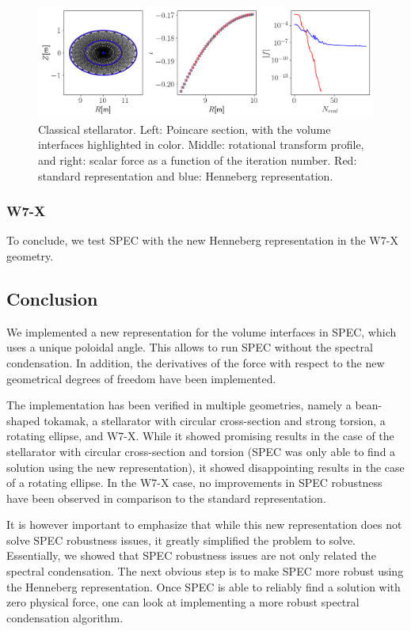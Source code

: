 \documentclass[my_thesis.tex]{subfiles}
\begin{document}
\begin{figure}
	\centering
	\includegraphics[width=\linewidth]{images/HennebergRepresentation/RotatingEllipse.png}
	\caption{Classical stellarator. Left: Poincare section, with the volume interfaces highlighted in color. Middle: rotational transform profile, and right: scalar force as a function of the iteration number. Red: standard representation and blue: Henneberg representation.}
	\label{fig classical stellarator henneberg representation}
\end{figure}


\subsubsection{W7-X}
To conclude, we test SPEC with the new Henneberg representation in the W7-X geometry.

\subsection{Conclusion}

We implemented a new representation for the volume interfaces in SPEC, which uses a unique poloidal angle. This allows to run SPEC without the spectral condensation. In addition, the derivatives of the force with respect to the new geometrical degrees of freedom have been implemented.

The implementation has been verified in multiple geometries, namely a bean-shaped tokamak, a stellarator with circular cross-section and strong torsion, a rotating ellipse, and W7-X. While it showed promising results in the case of the stellarator with circular cross-section and torsion (SPEC was only able to find a solution using the new representation), it showed disappointing results in the case of a rotating ellipse. In the W7-X case, no improvements in SPEC robustness have been observed in comparison to the standard representation.

It is however important to emphasize that while this new representation does not solve SPEC robustness issues, it greatly simplified the problem to solve. Essentially, we showed that SPEC robustness issues are not only related the spectral condensation. The next obvious step is to make SPEC more robust using the Henneberg representation. Once SPEC is able to reliably find a solution with zero physical force, one can look at implementing a more robust spectral condensation algorithm.
\end{document}
